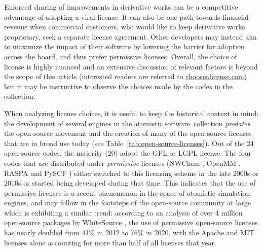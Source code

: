 \documentclass[9pt,review,pubversion]{livecoms}
\newcommand{\atsoft}{\href{https://atomistic.software}{atomistic.software}\ }
\begin{document}
Enforced sharing of improvements in derivative works can be a competitive advantage of adopting a viral license. 
It can also be one path towards financial revenue when commercial customers, who would like to keep derivative works proprietary, seek a separate license agreement.
Other developers may instead aim to maximize the impact of their software by lowering the barrier for adoption across the board, and thus prefer permissive licenses.
Overall, the choice of license is highly nuanced and an extensive discussion of relevant factors is beyond the scope of this article (interested readers are referred to \url{choosealicense.com}) but it may be instructive to observe the choices made by the codes in the collection.

When analyzing license choices, it is useful to keep the historical context in mind: the development of several engines in the \atsoft collection \emph{predates} the open-source movement and the creation of many of the open-source licenses that are in broad use today (see Table~\ref{tab:open-source-licenses}).
Out of the 24 open-source codes, the majority (20) adopt the GPL or LGPL license.
The four codes that are distributed under \emph{permissive} licenses (NWChem \cite{Apra2020}, OpenMM \cite{Eastman2017}, RASPA \cite{Dubbeldam2016a} and PySCF \cite{Sun2020a}) either switched to this licensing scheme in the late 2000s or 2010s or started being developed during that time.
This indicates that the use of permissive licenses is a recent phenomenon in the space of atomistic simulation engines, and may follow in the footsteps of the open-source community at large which is exhibiting a similar trend:
according to an analysis of over 4 million open-source packages by WhiteSource \cite{WhiteSource2021}, the use of permissive open-source licenses has nearly doubled from 41\% in 2012 to 76\% in 2020, with the Apache and MIT licenses alone accounting for more than half of all licenses that year.



\end{document}
